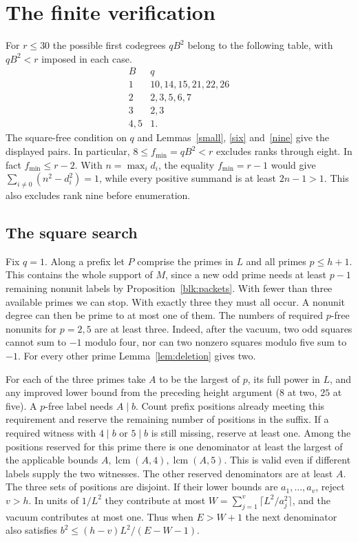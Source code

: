 \documentclass[11pt]{amsart}
\numberwithin{equation}{section}
\DeclareMathOperator{\lcm}{lcm}
\begin{document}
\section{The finite verification}\label{sec:verify}
For $r\le30$ the possible first codegrees $qB^2$ belong to the following table, with $qB^2<r$ imposed in each case.
\[
\begin{array}{c|l}
 B&q\\ \hline
 1&10,14,15,21,22,26\\
 2&2,3,5,6,7\\
 3&2,3\\
 4,5&1 .
\end{array}
\]
The square-free condition on $q$ and Lemmas~\ref{small}, \ref{six}
and~\ref{nine} give the displayed pairs. In particular,
$8\le f_{\min}=qB^2<r$ excludes ranks through eight. In fact
$f_{\min}\le r-2$. With $n=\max_i d_i$, the equality $f_{\min}=r-1$ would give
$\sum_{i\ne0}(n^2-d_i^2)=1$, while every positive summand is at
least $2n-1>1$. This also excludes rank nine before enumeration.

\subsection{The square search}
Fix $q=1$. Along a prefix let $P$ comprise the primes in $L$ and
all primes $p\le h+1$. This contains the whole support of $M$, since
a new odd prime needs at least $p-1$ remaining nonunit labels by
Proposition~\ref{blk:packets}. With fewer than three available
primes we can stop. With exactly three they must all occur.
A nonunit degree can then be prime to at most one of them.
The numbers of required $p$-free nonunits for $p=2,5$ are at
least three. Indeed, after the vacuum, two odd squares cannot sum
to $-1$ modulo four, nor can two nonzero squares modulo five sum
to $-1$. For every other prime Lemma~\ref{lem:deletion} gives two.

For each of the three primes take $A$ to be the largest of $p$,
its full power in $L$, and any improved lower bound from the
preceding height argument ($8$ at two, $25$ at five).
A $p$-free label needs $A\mid b$. Count prefix positions already
meeting this requirement and reserve the remaining number of
positions in the suffix. If a required witness with $4\mid b$ or
$5\mid b$ is still missing, reserve at least one. Among the
positions reserved for this prime there is one denominator at least
the largest of the applicable bounds $A,\lcm(A,4),\lcm(A,5)$.
This is valid even if different labels supply the two witnesses.
The other reserved denominators are at least $A$. The three sets
of positions are disjoint. If their lower bounds are
$a_1,\ldots,a_v$, reject $v>h$. In units of $1/L^2$ they contribute
at most $W=\sum_{j=1}^v\lceil L^2/a_j^2\rceil$, and the vacuum
contributes at most one. Thus when $E>W+1$ the next denominator
also satisfies $b^2\le(h-v)L^2/(E-W-1)$.
\end{document}
